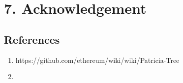 \hypertarget{acknowledgement}{%
\chapter{7. Acknowledgement}\label{acknowledgement}}

\hypertarget{references}{%
\section{References}\label{references}}

\begin{enumerate}
\def\labelenumi{\arabic{enumi}.}
\item
  https://github.com/ethereum/wiki/wiki/Patricia-Tree
\item
\end{enumerate}

